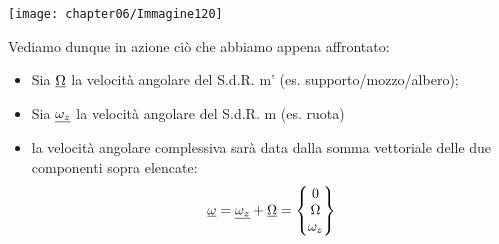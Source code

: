 	\begin{minipage}{.5\textwidth}
	\centering
	\texttt{[image: chapter06/Immagine120]}
	\end{minipage}
	\hfill
	\begin{minipage}{.5\textwidth}
		Vediamo dunque in azione ciò che abbiamo appena affrontato:
		\begin{itemize}
			\item Sia $\underline{\Omega}$ la velocità angolare del S.d.R. m' (es. supporto/mozzo/albero);
			\item Sia $\underline{\omega_z}$ la velocità angolare del S.d.R. m (es. ruota)
			\item la velocità angolare complessiva sarà data dalla somma vettoriale delle due componenti sopra elencate: 
			\[
			\underline{\omega} = \underline{\omega_z} + \underline{\Omega} = \begin{Bmatrix}0\\\Omega\\\omega_z\end{Bmatrix}
			\]
		\end{itemize}
	\end{minipage}
	
